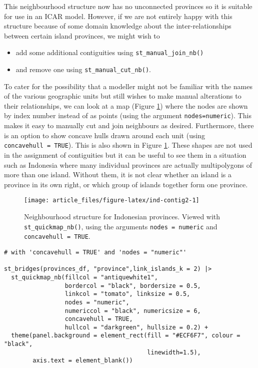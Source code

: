 This neighbourhood structure now has no unconnected provinces so it is
suitable for use in an ICAR model. However, if we are not entirely happy with this structure because of some domain knowledge about the inter-relationships between certain island provinces, we might wish to

\begin{itemize}
\item
  add some additional contiguities using \texttt{st\_manual\_join\_nb()}
\item
  and remove one using \texttt{st\_manual\_cut\_nb()}.
\end{itemize}

To cater for the possibility that a modeller might not be familiar with the names of the various geographic units but still wishes to make manual alterations to their relationships, we can look at a map (Figure \ref{fig:ind-contig2}) where the nodes are shown by
index number instead of as points (using the argument \texttt{nodes=\textquotesingle{}numeric\textquotesingle{}}). This makes it easy to manually cut
and join neighbours as desired. Furthermore, there is an option to
show concave hulls drawn around each unit (using \texttt{concavehull\ =\ TRUE}). This is also shown in Figure \ref{fig:ind-contig2}. These shapes are not used in the assignment of contiguities but it can be useful to see them in a situation such as Indonesia where many individual provinces are actually multipolygons of more than one island. Without them, it is not clear whether an island is a province in its own right, or which group of islands together form one province.



\begin{figure}

{\centering \texttt{[image: article\_files/figure-latex/ind-contig2-1]} 

}

\caption{Neighbourhood structure for Indonesian provinces. Viewed with \texttt{st\_quickmap\_nb()}, using the arguments \texttt{nodes\ =\ \textquotesingle{}numeric\textquotesingle{}} and \texttt{concavehull\ =\ TRUE}.}\label{fig:ind-contig2}
\end{figure}

\begin{verbatim}
# with 'concavehull = TRUE' and 'nodes = "numeric"'

st_bridges(provinces_df, "province",link_islands_k = 2) |> 
  st_quickmap_nb(fillcol = "antiquewhite1", 
                 bordercol = "black", bordersize = 0.5, 
                 linkcol = "tomato", linksize = 0.5, 
                 nodes = "numeric", 
                 numericcol = "black", numericsize = 6, 
                 concavehull = TRUE, 
                 hullcol = "darkgreen", hullsize = 0.2) + 
  theme(panel.background = element_rect(fill = "#ECF6F7", colour = "black", 
                                        linewidth=1.5),
        axis.text = element_blank())
\end{verbatim}


